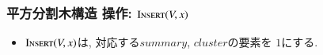 \documentclass[main]{subfiles}
\begin{document}
\begin{frame}\frametitle{平方分割木構造 操作: $\mathrm{\text{I\textsc{nsert}}}(V,x)$}
\begin{itemize}
\item $\mathrm{\text{I\textsc{nsert}}}(V,x)$は, 対応する$summary$, $cluster$の要素を $1$にする.
\end{itemize}
 

\end{frame}
\end{document}

